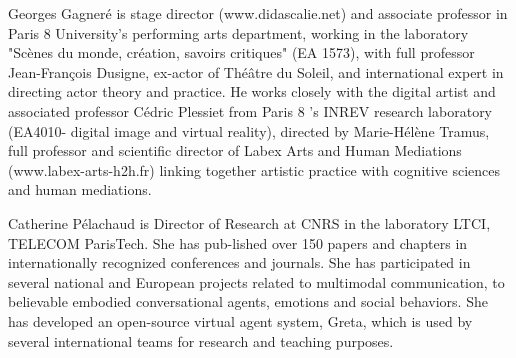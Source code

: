 Georges Gagner\'e is stage director (www.didascalie.net) and associate professor in Paris 8 University's performing arts department, working in the laboratory "Sc\`enes du monde, cr\'eation, savoirs critiques" (EA 1573), with full professor Jean-François Dusigne, ex-actor of Th\'e\^atre du Soleil, and international expert in directing actor theory and practice. He works closely with the digital artist and associated professor C\'edric Plessiet from Paris 8 's INREV research laboratory (EA4010- digital image and virtual reality), directed by Marie-H\'el\`ene Tramus, full professor and scientific director of Labex Arts and Human Mediations (www.labex-arts-h2h.fr) linking together artistic practice with cognitive sciences and human mediations.

Catherine P\'elachaud is Director of Research at CNRS in the laboratory LTCI, TELECOM ParisTech. She has pub-lished over 150 papers and chapters in internationally recognized conferences and journals. She has participated in several national and European projects related to multimodal communication, to believable embodied conversational agents, emotions and social behaviors. She has developed an open-source virtual agent system, Greta, which is used by several international teams for research and teaching purposes. 

\endinput

